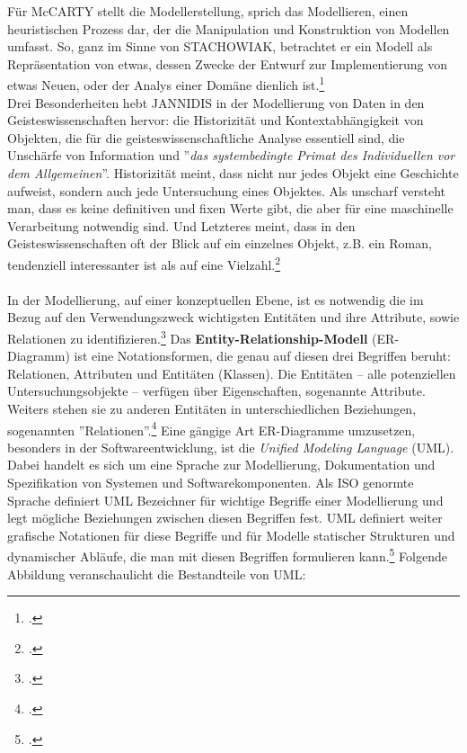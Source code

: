 \documentclass[12pt,a4paper]{article}
\begin{document}
Für McCARTY stellt die Modellerstellung, sprich das Modellieren, einen heuristischen Prozess dar, der die Manipulation und Konstruktion von Modellen umfasst. So, ganz im Sinne von STACHOWIAK, betrachtet er ein Modell als Repräsentation von etwas, dessen Zwecke der Entwurf zur Implementierung von etwas Neuen, oder der Analys einer Domäne dienlich ist.\footcite[][S.255]{mccarty2004modeling}
\\
Drei Besonderheiten hebt JANNIDIS in der Modellierung von Daten in den Geisteswissenschaften hervor: die Historizität und Kontextabhängigkeit von Objekten, die für die geisteswissenschaftliche Analyse essentiell sind, die Unschärfe von Information und ''\textit{das systembedingte Primat des Individuellen vor dem Allgemeinen}''. Historizität meint, dass nicht nur jedes Objekt eine Geschichte aufweist, sondern auch jede Untersuchung eines Objektes. Als unscharf versteht man, dass es keine definitiven und fixen Werte gibt, die aber für eine maschinelle Verarbeitung notwendig sind. Und Letzteres meint, dass in den Geisteswissenschaften oft der Blick auf ein einzelnes Objekt, z.B. ein Roman, tendenziell interessanter ist als auf eine Vielzahl.\footcite[][S.106-108]{jannidis2017grundlagen}
\\
\\
In der Modellierung, auf einer konzeptuellen Ebene, ist es notwendig die im Bezug auf den Verwendungszweck wichtigsten Entitäten und ihre Attribute, sowie Relationen zu identifizieren.\footcite[][S.102-104]{jannidis2017grundlagen} Das \textbf{Entity-Relationship-Modell} (ER-Diagramm) ist eine Notationsformen, die genau auf diesen drei Begriffen beruht: Relationen, Attributen und Entitäten (Klassen). Die Entitäten -- alle potenziellen Untersuchungsobjekte -- verfügen über Eigenschaften, sogenannte Attribute. Weiters stehen sie zu anderen Entitäten in unterschiedlichen Beziehungen, sogenannten ''Relationen''.\footcite{chen1976entity} Eine gängige Art ER-Diagramme umzusetzen, besonders in der Softwareentwicklung, ist die \textit{Unified Modeling Language} (UML). Dabei handelt es sich um eine Sprache zur Modellierung, Dokumentation und Spezifikation von Systemen und Softwarekomponenten. Als ISO genormte Sprache definiert UML Bezeichner für wichtige Begriffe einer Modellierung und legt mögliche Beziehungen zwischen diesen Begriffen fest. UML definiert weiter grafische Notationen für diese Begriffe und für Modelle statischer Strukturen und dynamischer Abläufe, die man mit diesen Begriffen formulieren kann.\footcite{rumbaugh2004unified} Folgende Abbildung veranschaulicht die Bestandteile von UML:
\end{document}
